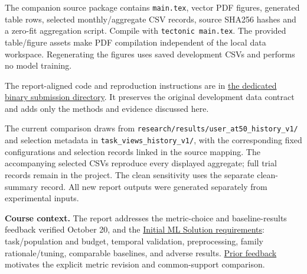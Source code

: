 \documentclass[11pt,letterpaper]{article}
\newcommand{\sect}[1]{\vspace{4pt}{\large\bfseries\color{teal}#1}\par}
\begin{document}
\sect{Reproducibility and evidence}
The companion source package contains \texttt{main.tex}, vector PDF figures, generated table rows, selected monthly/aggregate CSV records, source SHA256 hashes and a zero-fit aggregation script. Compile with \texttt{tectonic main.tex}. The provided table/figure assets make PDF compilation independent of the local data workspace. Regenerating the figures uses saved development CSVs and performs no model training.

The report-aligned code and reproduction instructions are in \href{https://github.com/Lyleeeeeeee/10718_MLinPractice/tree/report/initial-ml-binary-20261022/submissions/initial_ml_binary}{the dedicated binary submission directory}. It preserves the original development data contract and adds only the methods and evidence discussed here.

The current comparison draws from \texttt{research/results/user\_at50\_history\_v1/} and selection metadata in \texttt{task\_views\_history\_v1/}, with the corresponding fixed configurations and selection records linked in the source mapping. The accompanying selected CSVs reproduce every displayed aggregate; full trial records remain in the project. The clean sensitivity uses the separate clean-summary record. All new report outputs were generated separately from experimental inputs.

\textbf{Course context.} The report addresses the metric-choice and baseline-results feedback verified October 20, and the \href{https://canvas.cmu.edu/courses/56403/assignments/1023752}{Initial ML Solution requirements}: task/population and budget, temporal validation, preprocessing, family rationale/tuning, comparable baselines, and adverse results. \href{https://docs.google.com/spreadsheets/d/1QIaExyCzQZRZ8s9_8-jXQsVivJHy3t5D_VwVCl5kEWs/edit#gid=1437791232}{Prior feedback} motivates the explicit metric revision and common-support comparison.
\end{document}
